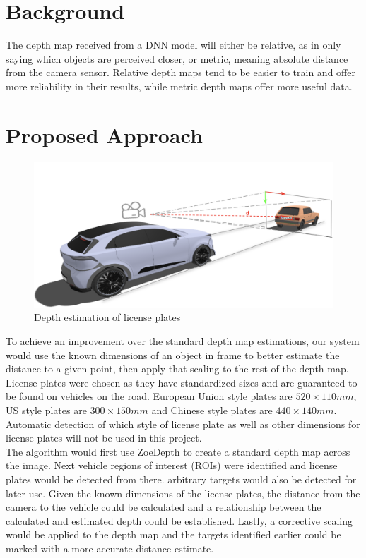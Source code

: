 \documentclass[12pt]{article}
\begin{document}
\section{Background}
The depth map received from a DNN model will either be relative, as in only saying which objects are perceived closer, or metric, meaning absolute distance from the camera sensor. Relative depth maps tend to be easier to train and offer more reliability in their results, while metric depth maps offer more useful data. \\



\section{Proposed Approach}
\begin{figure}[H]
    \centering
    \includegraphics[width=1.0\textwidth]{illustration.png}
    \caption{Depth estimation of license plates }
    \label{fig:illustration}
\end{figure}

To achieve an improvement over the standard depth map estimations, our system would use the known dimensions of an object in frame to better estimate the distance to a given point, then apply that scaling to the rest of the depth map. License plates were chosen as they have standardized sizes and are guaranteed to be found on vehicles on the road. European Union style plates are $520\times110mm$, US style plates are $300\times150mm$ and Chinese style plates are $440\times140mm$. Automatic detection of which style of license plate as well as other dimensions for license plates will not be used in this project.\\

The algorithm would first use ZoeDepth to create a standard depth map across the image. Next vehicle regions of interest (ROIs) were identified and license plates would be detected from there. arbitrary targets would also be detected for later use. Given the known dimensions of the license plates, the distance from the camera to the vehicle could be calculated and a relationship between the calculated and estimated depth could be established. Lastly, a corrective scaling would be applied to the depth map and the targets identified earlier could be marked with a more accurate distance estimate.
\end{document}
